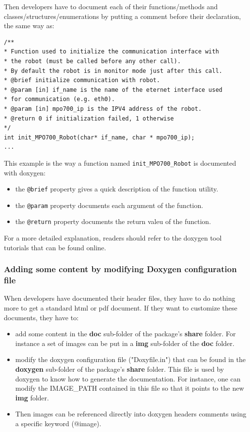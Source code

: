\documentclass[12pt,a4paper]{article}
\begin{document}
Then developers have to document each of their functions/methods and classes/structures/enumerations by putting a comment before their declaration, the same way as:
\begin{verbatim}
/**
* Function used to initialize the communication interface with  
* the robot (must be called before any other call). 
* By default the robot is in monitor mode just after this call.
* @brief initialize communication with robot.
* @param [in] if_name is the name of the eternet interface used
* for communication (e.g. eth0).
* @param [in] mpo700_ip is the IPV4 address of the robot.
* @return 0 if initialization failed, 1 otherwise
*/
int init_MPO700_Robot(char* if_name, char * mpo700_ip);
...
\end{verbatim}

This example is the way a function named \texttt{init\_MPO700\_Robot} is documented with doxygen:
\begin{itemize}
\item the \texttt{@brief} property gives a quick description of the function utility.
\item the \texttt{@param} property documents each argument of the function.
\item the \texttt{@return} property documents the return valeu of the function.
\end{itemize}

For a more detailed explanation, readers should refer to the doxygen tool tutorials that can be found online. 

\subsubsection{Adding some content by modifying Doxygen configuration file}
\label{sec:apiCMakeDoxyfile}

When developers have documented their header files, they have to do nothing more to get a standard html or pdf document. If they want to customize these documents, they have to:
\begin{itemize}
\item add some content in the \textbf{doc} sub-folder of the package's \textbf{share} folder. For instance a set of images can be put in a \textbf{img} sub-folder of the \textbf{doc} folder. 
\item modify the doxygen configuration file ("Doxyfile.in") that can be found in the \textbf{doxygen} sub-folder of the package's \textbf{share} folder. This file is used by doxygen to know how to generate the documentation. For instance, one can modify the IMAGE\_PATH contained in this file so that it points to the new \textbf{img} folder.
\item Then images can be referenced directly into doxygen headers comments using a specific keyword (@image).
\end{itemize}
\end{document}
